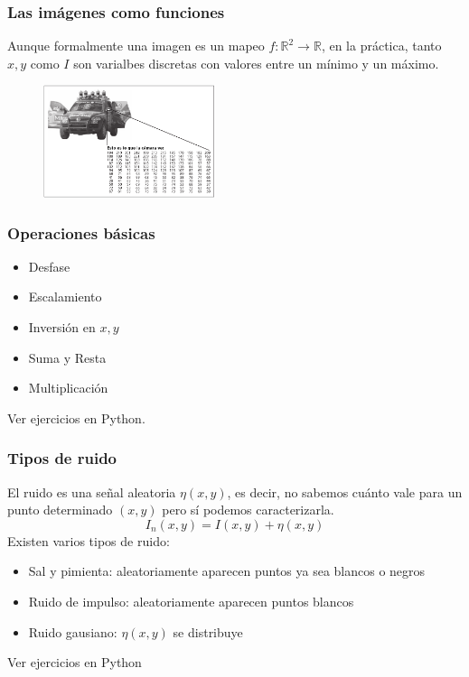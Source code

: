 \begin{frame}\frametitle{Las imágenes como funciones}
    Aunque formalmente una imagen es un mapeo $f:\mathbb{R}^2\rightarrow \mathbb{R}$, en la práctica, tanto $x,y$ como $I$ son varialbes discretas con valores entre un mínimo y un máximo.
\begin{figure}
  \centering
  \includegraphics[width=0.45\textwidth]{Figures/ImageRepresentation.png}
\end{figure}
\end{frame}


\begin{frame}\frametitle{Operaciones básicas}
  \begin{itemize}
  \item Desfase
  \item Escalamiento
  \item Inversión en $x,y$
  \item Suma y Resta 
  \item Multiplicación
  \end{itemize}
  Ver ejercicios en Python.
\end{frame}

\begin{frame}\frametitle{Tipos de ruido}
  El ruido es una señal aleatoria $\eta(x,y)$, es decir, no sabemos cuánto vale para un punto determinado $(x,y)$ pero sí podemos caracterizarla.
  \[I_n(x,y) = I(x,y) + \eta(x,y)\]
  Existen varios tipos de ruido:
  \begin{itemize}
  \item Sal y pimienta: aleatoriamente aparecen puntos ya sea blancos o negros
  \item Ruido de impulso: aleatoriamente aparecen puntos blancos
  \item Ruido gausiano: $\eta(x,y)$ se distribuye 
  \end{itemize}
  Ver ejercicios en Python
\end{frame}


